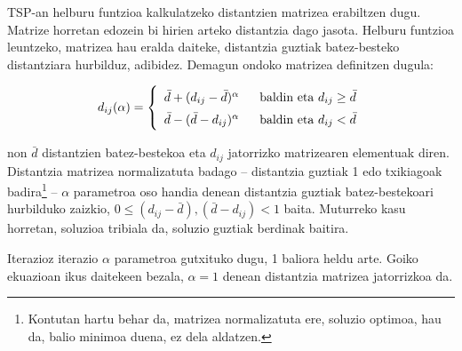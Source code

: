 \documentclass[eu]{ifirak}\usepackage[]{graphicx}\usepackage[]{color}
\begin{document}
\begin{tcolorbox}
\begin{ifexample}

TSP-an helburu funtzioa kalkulatzeko distantzien matrizea erabiltzen dugu. Matrize horretan edozein bi hirien arteko distantzia dago jasota. Helburu funtzioa leuntzeko, matrizea hau eralda daiteke, distantzia guztiak batez-besteko distantziara hurbilduz, adibidez. Demagun ondoko matrizea definitzen dugula:

\begin{align}
\renewcommand*{\arraystretch}{1.5}
d_{ij}(\alpha) = \left\{
\begin{array}{ll}
\bar{d} + (d_{ij} - \bar{d})^\alpha &\ \ \mbox{baldin eta } d_{ij}\geq \bar{d}\\
\bar{d} - (\bar{d} - d_{ij})^\alpha &\ \ \mbox{baldin eta } d_{ij} < \bar{d}
\end{array}\right.
\end{align}

\noindent non $\bar{d}$ distantzien batez-bestekoa eta $d_{ij}$ jatorrizko matrizearen elementuak diren. Distantzia matrizea normalizatuta badago -- distantzia guztiak 1 edo txikiagoak badira\footnote{Kontutan hartu behar da, matrizea normalizatuta ere, soluzio optimoa, hau da, balio minimoa duena, ez dela aldatzen.} -- $\alpha$ parametroa oso handia denean distantzia guztiak batez-bestekoari hurbilduko zaizkio, $0\leq (d_{ij} - \bar{d}),(\bar{d} - d_{ij})<1$ baita. Muturreko kasu horretan, soluzioa tribiala da, soluzio guztiak berdinak baitira. 

Iterazioz iterazio $\alpha$ parametroa gutxituko dugu, 1 baliora heldu arte. Goiko ekuazioan ikus daitekeen bezala, $\alpha=1$ denean distantzia matrizea jatorrizkoa da.
\end{ifexample}
\end{tcolorbox}




\end{document}
